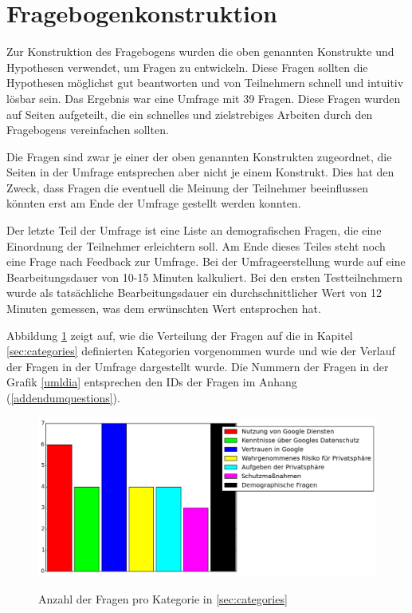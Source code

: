 \section{Fragebogenkonstruktion}
Zur Konstruktion des Fragebogens wurden die oben genannten Konstrukte und Hypothesen verwendet, um Fragen zu entwickeln. Diese Fragen sollten die Hypothesen möglichst gut beantworten und von Teilnehmern schnell und intuitiv lösbar sein. Das Ergebnis war eine Umfrage mit 39 Fragen. Diese Fragen wurden auf Seiten aufgeteilt, die ein schnelles und zielstrebiges Arbeiten durch den Fragebogens vereinfachen sollten.

Die Fragen sind zwar je einer der oben genannten Konstrukten zugeordnet, die Seiten in der Umfrage entsprechen aber nicht je einem Konstrukt. Dies hat den Zweck, dass Fragen die eventuell die Meinung der Teilnehmer beeinflussen könnten erst am Ende der Umfrage gestellt werden konnten.

Der letzte Teil der Umfrage ist eine Liste an demografischen Fragen, die eine Einordnung der Teilnehmer erleichtern soll. Am Ende dieses Teiles steht noch eine Frage nach Feedback zur Umfrage.
Bei der Umfrageerstellung wurde auf eine Bearbeitungsdauer von 10-15 Minuten kalkuliert. Bei den ersten Testteilnehmern wurde als tatsächliche Bearbeitungsdauer ein durchschnittlicher Wert von 12 Minuten gemessen, was dem erwünschten Wert entsprochen hat.

Abbildung \ref{catnumbers} zeigt auf, wie die Verteilung der Fragen auf die in Kapitel \ref{sec:categories} definierten Kategorien vorgenommen wurde und wie der Verlauf der Fragen in der Umfrage dargestellt wurde. Die Nummern der Fragen in der Grafik \ref{umldia} entsprechen den IDs der Fragen im Anhang (\ref{addendumquestions}). 

\begin{figure}[H]
\centering
\includegraphics[width=\textwidth]{images/zahlenkategorien}\\
\caption{Anzahl der Fragen pro Kategorie in \ref{sec:categories}}\label{catnumbers}
\end{figure}

